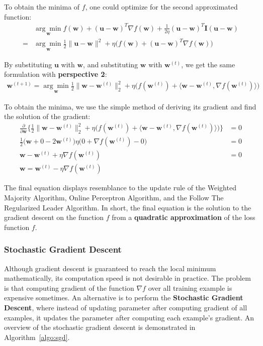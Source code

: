 \documentclass[11pt]{article}
\newcommand{\bw}{\boldsymbol{w}}
\newcommand{\bu}{\boldsymbol{u}}
\begin{document}
To obtain the minima of $f$, one could optimize for the second approximated function:
\begin{equation*}
\begin{split}
&\underset{\bw}{\arg\min} f(\bw) + (\bu-\bw)^T \nabla f(\bw) + \frac{1}{2\eta} (\bu-\bw)^T \boldsymbol{I} (\bu-\bw) \\
=& \underset{\bw}{\arg\min} \frac{1}{2} \|\bu-\bw\|^2 +
\eta \Big( f(\bw) + (\bu-\bw)^T \nabla f(\bw) \Big)
\end{split}
\end{equation*}

By substituting $\bu$ with $\bw$, and substituting $\bw$ with $\bw^{(t)}$, we get the same formulation with \textbf{perspective 2}:
\begin{equation*}
\begin{split}
\bw^{(t+1)} = 
\underset{\bw}{\arg\min} \frac{1}{2} \| \bw - \bw^{(t)} \|_2^2 
+ \eta\Big(f(\bw^{(t)}) + \langle \bw-\bw^{(t)}, \nabla f(\bw^{(t)}) \rangle \Big)
\end{split}
\end{equation*}

To obtain the minima, we use the simple method of deriving its gradient and find the solution of the gradient:
\begin{equation*}
\begin{split}
\frac{\partial}{\partial\bw}\Bigg\{ 
\frac{1}{2} \| \bw - \bw^{(t)} \|_2^2 
+ \eta\Big(f(\bw^{(t)}) + \langle \bw-\bw^{(t)}, \nabla f(\bw^{(t)}) \rangle \Big)
\Bigg\} &= 0 \\
\frac{1}{2}\Big( \bw+0-2\bw^{(t)} \Big)
\eta \Big( 0 + \nabla f(\bw^{(t)}) - 0 \Big) &= 0 \\
\bw - \bw^{(t)} + \eta \nabla f(\bw^{(t)}) &= 0 \\
\bw = \bw^{(t)} - \eta \nabla f(\bw^{(t)})
\end{split}
\end{equation*}

The final equation displays resemblance to the update rule of the Weighted Majority Algorithm, 
Online Perceptron Algorithm, and the Follow The Regularized Leader Algorithm. In short, the final equation is the solution to the gradient descent on the function $f$ from a \textbf{quadratic approximation} of the loss function $f$.

\subsubsection{Stochastic Gradient Descent}
Although gradient descent is guaranteed to reach the local minimum mathematically, its computation speed is not desirable in practice. The problem is that computing gradient of the function $\nabla f$ over all training example is expensive sometimes. An alternative is to perform the \textbf{Stochastic Gradient Descent}, where instead of updating parameter after computing gradient of all examples, it updates the parameter after computing each example's gradient. An overview of the stochastic gradient descent is demonstrated in Algorithm~\ref{algo:sgd}.
\end{document}
